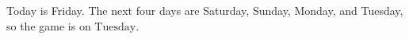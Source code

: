 Today is Friday. The next four days are Saturday, Sunday, Monday, and Tuesday, so the game is on $\boxed{\text{Tuesday}}$.
